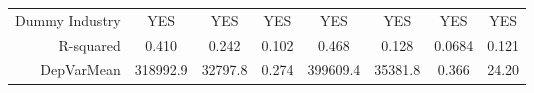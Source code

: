 \begin{tabular}{rrrrrrrr}
Dummy Industry & \multicolumn{1}{c}{YES} & \multicolumn{1}{c}{YES} & \multicolumn{1}{c}{YES} & \multicolumn{1}{c}{YES} & \multicolumn{1}{c}{YES} & \multicolumn{1}{c}{YES} & \multicolumn{1}{c}{YES} \\
R-squared & \multicolumn{1}{c}{0.410} & \multicolumn{1}{c}{0.242} & \multicolumn{1}{c}{0.102} & \multicolumn{1}{c}{0.468} & \multicolumn{1}{c}{0.128} & \multicolumn{1}{c}{0.0684} & \multicolumn{1}{c}{0.121} \\
DepVarMean & \multicolumn{1}{c}{318992.9} & \multicolumn{1}{c}{32797.8} & \multicolumn{1}{c}{0.274} & \multicolumn{1}{c}{399609.4} & \multicolumn{1}{c}{35381.8} & \multicolumn{1}{c}{0.366} & \multicolumn{1}{c}{24.20} \\
\bottomrule
\end{tabular}%
